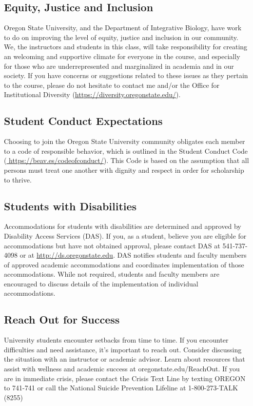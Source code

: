 \documentclass[10pt]{article}
\begin{document}
\subsection*{Equity, Justice and Inclusion}
Oregon State University, and the Department of Integrative Biology, have work to do on
improving the level of equity, justice and inclusion in our community.
We, the instructors and students in this class, will take responsibility for creating an welcoming and supportive climate for everyone in the course, and especially for those who are underrepresented and marginalized in academia and in our society. If you have concerns or suggestions related to these issues as they pertain to the course, please do not
hesitate to contact me and/or the Office for Institutional Diversity
(\href{https://diversity.oregonstate.edu/}{https://diversity.oregonstate.edu/}).

\subsection*{Student Conduct Expectations}
Choosing to join the Oregon State University community obligates each member to a code of responsible
behavior, which is outlined in the Student Conduct Code
(\href{https://beav.es/codeofconduct/}{ https://beav.es/codeofconduct/}).
This Code is based on the assumption that all persons must treat one another with dignity and respect
in order for scholarship to thrive.

\subsection*{Students with Disabilities}
Accommodations for students with disabilities are determined and approved by Disability Access
Services (DAS).
If you, as a student, believe you are eligible for accommodations but have not obtained approval, please
contact DAS at 541-737-4098 or at
\href{http://ds.oregonstate.edu}{http://ds.oregonstate.edu}.
DAS notifies students and faculty members of approved academic accommodations and coordinates
implementation of those accommodations.
While not required, students and faculty members are encouraged to discuss details of the
implementation of individual accommodations.

\subsection*{Reach Out for Success}
University students encounter setbacks from time to time. If you encounter difficulties and need assistance, it’s important to reach out. Consider discussing the situation with an instructor or academic advisor. Learn about resources that assist with wellness and academic success at oregonstate.edu/ReachOut. If you are in immediate crisis, please contact the Crisis Text Line by texting OREGON to 741-741 or call the National Suicide Prevention Lifeline at 1-800-273-TALK (8255)
\end{document}
